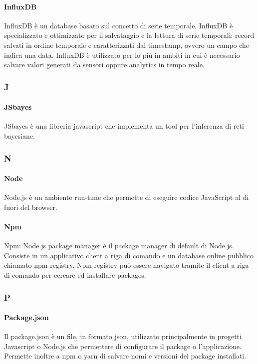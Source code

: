 	\paragraph{InfluxDB} \Spazio
	\label{sec:influxdb}
InfluxDB è un database basato sul concetto di serie temporale. InfluxDB è specializzato e ottimizzato per il salvataggio e la lettura di serie temporali: record salvati in ordine temporale e caratterizzati dal timestamp, ovvero un campo che indica una data. InfluxDB è utilizzato per lo più in ambiti in cui è necessario salvare valori generati da sensori oppure analytics in tempo reale.
	
\subsubsection{J}

	\paragraph{JSbayes} \Spazio
	\label{sec:influxdb}
JSbayes è una libreria javascript che implementa un tool per l'inferenza di reti bayesiane. 


\subsubsection{N}

	\paragraph{Node} \Spazio
	\label{sec:node}
Node.js è un ambiente run-time che permette di eseguire codice JavaScript al di fuori del browser.

	\paragraph{Npm} \Spazio
	\label{sec:npm}
Npm: Node.js package manager è il package manager di default di Node.js. Consiste in un applicativo client a riga di comando e un database online pubblico chiamato npm registry. Npm registry può essere navigato tramite il client a riga di comando per cercare ed installare packages.


\subsubsection{P}

	\paragraph{Package.json} \Spazio
	\label{sec:package}
Il package.json è un file, in formato json, utilizzato principalmente in progetti Javascript o Node.js che permettere di configurare il package o l'applicazione. Permette inoltre a npm o yarn di salvare nomi e versioni dei package installati.


